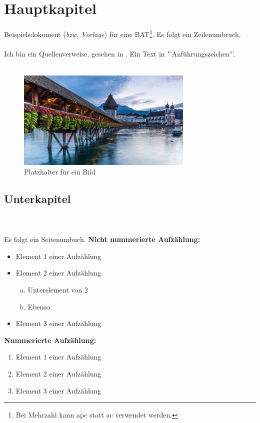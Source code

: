 \section{Hauptkapitel}\label{sec:hauptkapitel}
Beispielsdokument (\emph{bzw. Vorlage}) für eine \ac{BAT}\footnote{Bei Mehrzahl kann apc statt ac verwendet werden.}. Es folgt ein Zeilenumbruch.\\ 
~\\ %
Ich bin ein Quellenverweise, gesehen in \cite[S.~57]{KeilStefan2017D}. Ein Text in "'Anführungszeichen"'.\\\\
\lipsum[1]
\begin{figure}[H]
	\centering
	\includegraphics[width=0.75\textwidth]{../fig/placeholder}
	\caption{Platzhalter für ein Bild}
	\label{fig:testaufbau_uebersicht}
\end{figure}
\subsection{Unterkapitel}
\lipsum[1]\\\\
Es folgt ein Seitenumbuch.
\newpage \noindent
\textbf{Nicht nummerierte Aufzählung:}
\begin{itemize}[itemsep=-5pt,topsep=0pt]
	\item Element 1 einer Aufzählung
	\item Element 2 einer Aufzählung
	\begin{enumerate}[a), itemsep=-2pt,topsep=-6pt]
		\item Unterelement von 2 
		\item Ebenso
	\end{enumerate}
	\item Element 3 einer Aufzählung
\end{itemize}
\textbf{Nummerierte Aufzählung:}
\begin{enumerate}[itemsep=-5pt,topsep=0pt]
	\item Element 1 einer Aufzählung
	\item Element 2 einer Aufzählung
	\item Element 3 einer Aufzählung
\end{enumerate}
